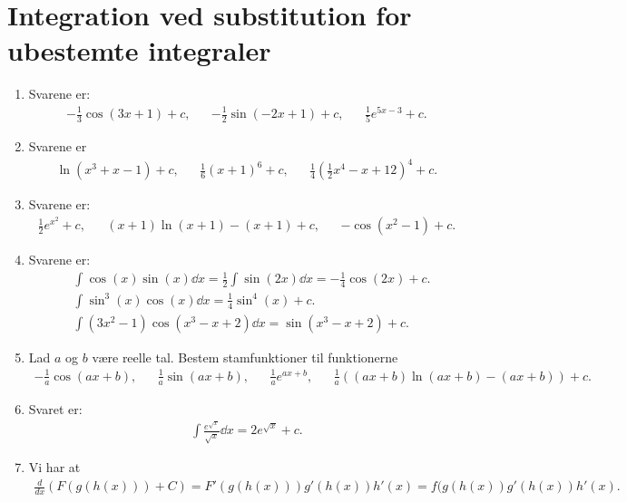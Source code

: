\section{Integration ved substitution for ubestemte integraler}

\begin{enumerate}
	\item Svarene er:
	\begin{align*}
	-\frac{1}{3}\cos(3x+1)+c,&& -\frac{1}{2} \sin(-2x+1)+c, && \frac{1}{5}e^{5x-3}+c.
	\end{align*}
	
	\item Svarene er
	\begin{align*}
	\ln(x^3+x-1)+c,&& \frac{1}{6}(x+1)^6+c,&& \frac{1}{4}(\frac{1}{2}x^4-x+12)^4+c.
	\end{align*}
	
		
	\item Svarene er:
	\begin{align*}
	\frac{1}{2}e^{x^2}+c, && (x+1)\ln(x+1)-(x+1)+c,&& -\cos(x^2-1)+c.
	\end{align*}
	

	
	\item Svarene er:
	\begin{align*}
	&\int \cos(x)\sin(x) \dd x=\frac{1}{2}\int \sin(2x)\dd x=-\frac{1}{4}\cos(2x)+c.\\
	&\int \sin^3(x)\cos(x) \dd x=\frac{1}{4}\sin^4(x)+c.\\	
	&\int (3x^2-1)\cos(x^3-x+2) \dd x= \sin(x^3-x+2)+c.
	\end{align*}
	
	\item Lad $a$ og $b$ være reelle tal. Bestem stamfunktioner til funktionerne
	\begin{align*}
	-\frac{1}{a} \cos(ax+b),&& \frac{1}{a}\sin(ax+b),&& \frac{1}{a}e^{ax+b},&&\frac{1}{a}((ax+b)\ln(ax+b)-(ax+b)) +c.
	\end{align*}
	
	\item Svaret er:
	\begin{align*}
	\int \frac{e^{\sqrt{x}}}{\sqrt{x}} \dd x=2e^{\sqrt{x}}+c.
	\end{align*}


	\item Vi har at 
	\begin{align*}
	\frac{d}{dx}(F(g(h(x))) +C)=F'(g(h(x)))g'(h(x))h'(x)=f(g(h(x))g'(h(x))h'(x).
	\end{align*}
	

\end{enumerate}
